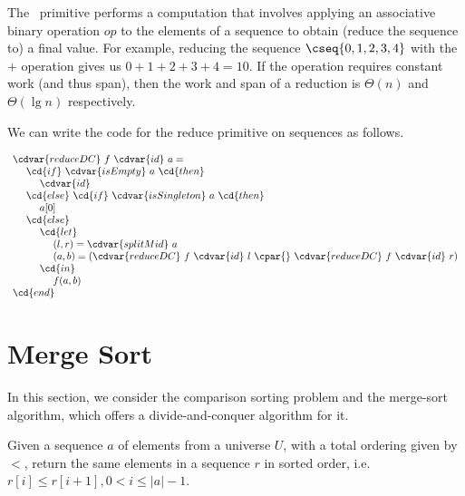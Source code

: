 \begin{algorithm}
\label{alg:design::dc::reduce}
The~ primitive performs a computation that involves
applying an associative binary operation $op$ to the elements of a
sequence to obtain (reduce the sequence to) a final value.
%
For example, reducing the sequence $\cseq{0,1,2,3,4}$ with the $+$
operation gives us $0 + 1 + 2 + 3 + 4 = 10$.
%
If the operation requires constant work (and thus span), then the work
and span of a reduction is $\Theta(n)$ and $\Theta(\lg{n})$ respectively.

We can write the code for the reduce primitive on sequences as
follows.

\[
\begin{array}{l}
\cdvar{reduceDC}~f~\cdvar{id}~a =
\\
~~~~\cd{if}~\cdvar{isEmpty}~ a~\cd{then}
\\
~~~~~~~~\cdvar{id}
\\
~~~~\cd{else}~\cd{if}~\cdvar{isSingleton}~a~\cd{then}
\\
~~~~~~~~a[0]
\\
~~~~\cd{else}
\\ 
~~~~~~~~\cd{let}
\\ 
~~~~~~~~~~~~(l, r) = \cdvar{splitMid}~a
\\
~~~~~~~~~~~~(a, b) = (\cdvar{reduceDC}~f~\cdvar{id}~l~\cpar{}~\cdvar{reduceDC}~f~\cdvar{id}~r)
\\
~~~~~~~~\cd{in} 
\\
~~~~~~~~~~~~f(a,b)
\\ 
\cd{end}        
\end{array} 
\]
\end{algorithm}

\section{Merge Sort}
\label{sec:design::dc::msort}

\begin{gram}
In this section, we consider the comparison sorting problem and the
merge-sort algorithm, which offers a divide-and-conquer algorithm for
it.
\end{gram}

\begin{definition}
\label{def:problem::comparison-sorting}
  Given a sequence $a$ of elements from a universe $U$, with a total
  ordering given by $<$, return the same elements in a sequence $r$
  in sorted order, i.e. $r[i] \leq r[i+1], 0 < i \leq |a|-1$.
\end{definition}

